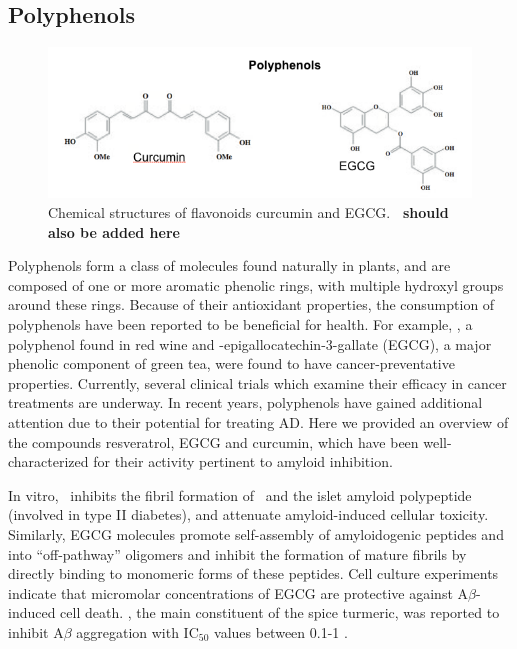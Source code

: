 \subsection{Polyphenols}
\begin{figure}
\centering
\includegraphics[width=6in]{figures/introduction/polyphenols.png}
\caption[Polyphenol molecules]{Chemical structures of flavonoids curcumin and EGCG. \textbf{\resve\ should also be added here}}
\label{fig:polyphenols}
\end{figure}

Polyphenols form a class of molecules found naturally in plants, and are composed of one or more aromatic phenolic rings, with multiple hydroxyl groups around these rings.  Because of their antioxidant properties, the consumption of polyphenols have been reported to be beneficial for health.  For example, \resve, a polyphenol found in red wine and  -epigallocatechin-3-gallate (EGCG), a major phenolic component of green tea, were found to have cancer-preventative properties.\cite{Baur:2006bx,Singh:2011ec} Currently, several clinical trials which examine their efficacy in cancer treatments are underway.\cite{Baur:2006bx,Singh:2011ec} In recent years, polyphenols have gained additional attention due to their potential for treating AD.\cite{Porat:2006fn} Here we provided an overview of the compounds resveratrol, EGCG and curcumin, which have been well-characterized for their activity pertinent to amyloid inhibition.

In vitro, \resve\ inhibits the fibril formation of \abeta\ and the islet amyloid polypeptide (involved in type II diabetes), and attenuate amyloid-induced cellular toxicity.\cite{Ono:2008bl,Feng:2009p2240} Similarly, EGCG molecules promote self-assembly of amyloidogenic peptides \abeta\cite{Ehrnhoefer:2008fd} and \alphas\cite{Bieschke:2010ju} into ``off-pathway'' oligomers and inhibit the formation of mature fibrils by directly binding to monomeric forms of these peptides. Cell culture experiments indicate that micromolar concentrations of EGCG are protective against A$\beta$-induced cell death.\cite{Levites:2003wm,Bastianetto:2006du} \cur, the main constituent of the spice turmeric, was reported to inhibit A$\beta$ aggregation with IC$_{50}$ values between 0.1-1 \micromolar.\cite{Singh:2012df,Ono:2004td,Hamaguchi:2009p2874,Kim:2005wk} 



